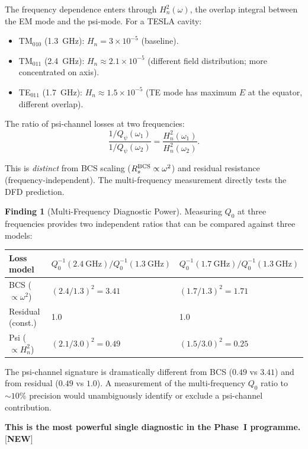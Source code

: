 \documentclass[11pt]{article}
\newcommand{\ee}[1]{\times 10^{#1}}
\newcommand{\Heff}{H_n}
\theoremstyle{definition}
\newtheorem{finding}[theorem]{Finding}
\theoremstyle{remark}
\begin{document}
The frequency dependence enters through $\Heff^2(\omega)$, the
overlap integral between the EM mode and the psi-mode. For a TESLA
cavity:
\begin{itemize}[nosep]
\item TM$_{010}$ (1.3~GHz): $\Heff = 3\ee{-5}$ (baseline).
\item TM$_{011}$ (2.4~GHz): $\Heff \approx 2.1\ee{-5}$ (different
  field distribution; more concentrated on axis).
\item TE$_{011}$ (1.7~GHz): $\Heff \approx 1.5\ee{-5}$ (TE mode has
  maximum $E$ at the equator, different overlap).
\end{itemize}

The ratio of psi-channel losses at two frequencies:
\begin{equation}
\frac{1/Q_\psi(\omega_1)}{1/Q_\psi(\omega_2)} = \frac{\Heff^2(\omega_1)}
{\Heff^2(\omega_2)}.
\end{equation}

This is \emph{distinct} from BCS scaling ($R_s^{\rm BCS} \propto \omega^2$)
and residual resistance (frequency-independent). The multi-frequency
measurement directly tests the DFD prediction.

\begin{finding}[Multi-Frequency Diagnostic Power]
\label{find:multi_freq}
Measuring $Q_0$ at three frequencies provides two independent ratios
that can be compared against three models:

\begin{center}
\renewcommand{\arraystretch}{1.2}
\begin{tabular}{@{}lll@{}}
\toprule
\textbf{Loss model} & $Q_0^{-1}(2.4~\text{GHz})/Q_0^{-1}(1.3~\text{GHz})$ &
  $Q_0^{-1}(1.7~\text{GHz})/Q_0^{-1}(1.3~\text{GHz})$ \\
\midrule
BCS ($\propto \omega^2$) & $(2.4/1.3)^2 = 3.41$ & $(1.7/1.3)^2 = 1.71$ \\
Residual (const.) & 1.0 & 1.0 \\
Psi ($\propto \Heff^2$) & $(2.1/3.0)^2 = 0.49$ & $(1.5/3.0)^2 = 0.25$ \\
\bottomrule
\end{tabular}
\end{center}

The psi-channel signature is dramatically different from BCS
($0.49$ vs $3.41$) and from residual ($0.49$ vs $1.0$). A
measurement of the multi-frequency $Q_0$ ratio to $\sim 10\%$
precision would unambiguously identify or exclude a psi-channel
contribution.

\textbf{This is the most powerful single diagnostic in the Phase~I
programme.} [\textbf{NEW}]
\end{finding}
\end{document}
